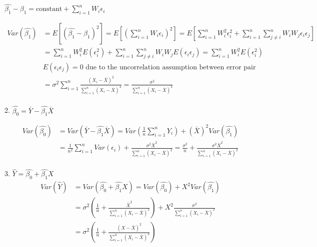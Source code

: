 \documentclass[11pt]{article}
\begin{document}
$\hat{\beta_1} - \beta_1 = \text{constant} + \sum\limits_{i=1}^nW_i\epsilon_i$

\begin{align*}
Var(\hat{\beta_1}) &= E[(\hat{\beta_1} - \beta_1)^2] = E[(\sum\limits_{i=1}^nW_i\epsilon_i)^2] = E[\sum\limits_{i=1}^nW_i^2\epsilon_i^2 + \sum\limits_{i=1}^n\sum\limits_{j\neq i}^nW_iW_j\epsilon_i\epsilon_j] \\
&= \sum\limits_{i=1}^nW_i^2E(\epsilon_i^2) + \sum\limits_{i=1}^n\sum\limits_{j\neq i}^nW_iW_jE(\epsilon_i\epsilon_j) = \sum\limits_{i=1}^nW_i^2E(\epsilon_i^2)\\
&E(\epsilon_i\epsilon_j) = 0 \text{ due to the uncorrelation assumption between error pair} \\
&= \sigma^2\sum\limits_{i=1}^n\frac{(X_i - \bar{X})^2}{\sum\limits_{i=1}^n(X_i - \bar{X})^4} = \frac{\sigma^2}{\sum\limits_{i=1}^n(X_i - \bar{X})^2}
\end{align*}
 \\
2. $\hat{\beta_0} = \bar{Y} - \hat{\beta_1}\bar{X}$ 

\begin{align*}
Var(\hat{\beta_0}) &= Var(\bar{Y} - \hat{\beta_1}\bar{X}) = Var(\frac{1}{n}\sum\limits_{i=1}^nY_i) + (\bar{X})^2Var(\hat{\beta_1}) \\
&= \frac{1}{n^2}\sum\limits_{i=1}^nVar(\epsilon_i) + \frac{\sigma^2\bar{X}^2}{\sum\limits_{i=1}^n(X_i - \bar{X})^2} = \frac{\sigma^2}{n} + \frac{\sigma^2\bar{X}^2}{\sum\limits_{i=1}^n(X_i - \bar{X})^2}
\end{align*}
 \\
3. $\hat{Y} = \hat{\beta_0} + \hat{\beta_1}X$ 
\begin{align*}
Var(\hat{Y}) &= Var(\hat{\beta_0} + \hat{\beta_1}X) = Var(\hat{\beta_0}) + X^2Var(\hat{\beta_1}) \\
&= \sigma^2(\frac{1}{n} + \frac{\bar{X}^2}{\sum\limits_{i=1}^n(X_i - \bar{X})^2}) + X^2\frac{\sigma^2}{\sum\limits_{i=1}^n(X_i - \bar{X})^2} \\
&= \sigma^2(\frac{1}{n} + \frac{(X - \bar{X})^2}{\sum\limits_{i=1}^n(X_i - \bar{X})^2})
\end{align*}
\end{document}
